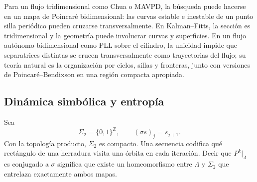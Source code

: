 

Para un flujo tridimensional como Chua o MAVPD, la búsqueda puede hacerse en
un mapa de Poincaré bidimensional: las curvas estable e inestable de un punto
silla periódico pueden cruzarse transversalmente. En Kalman--Fitts, la
sección es tridimensional y la geometría puede involucrar curvas y
superficies. En un flujo autónomo bidimensional como PLL sobre el cilindro, la
unicidad impide que separatrices distintas se crucen transversalmente como
trayectorias del flujo; su teoría natural es la organización por ciclos,
sillas y fronteras, junto con versiones de Poincaré--Bendixson en una región
compacta apropiada.

\subsection{Dinámica simbólica y entropía}

\begin{definition}
Sea
\begin{equation}
 \Sigma_2=\{0,1\}^{\mathbb Z},\qquad
 (\sigma s)_j=s_{j+1}.
 \label{geo:eq:full-shift}
\end{equation}
Con la topología producto, \(\Sigma_2\) es compacto. Una secuencia codifica qué
rectángulo de una herradura visita una órbita en cada iteración. Decir que
\(P^k|_\Lambda\) es conjugado a \(\sigma\) significa que existe un
homeomorfismo entre \(\Lambda\) y \(\Sigma_2\) que entrelaza exactamente ambos
mapas.
\end{definition}


